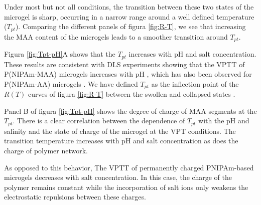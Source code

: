 Under most but not all conditions, the transition between these two states of the microgel is sharp, occurring in a narrow range around a well defined temperature ($T_{pt}$).
Comparing the different panels of figura \ref{fig:R-T}, we see that increasing the MAA content of the microgels leads to a smoother transition around $T_{pt}$.



Figura \ref{fig:Tpt-pH}A shows that the $T_{pt}$ increases with pH and salt concentration.
These results are consistent with DLS experiments showing that the VPTT of P(NIPAm-MAA) microgels increases with pH \addcite[Kleinen2008], which has also been observed for P(NIPAm-AA) microgels \addcite[CaprilesGonzalez2008].
We have defined $T_{pt}$ as the inflection point of the $R(T)$ curves of figura \ref{fig:R-T} between the swollen and collapsed states \addcite[Kratz2001].






Panel B of figura \ref{fig:Tpt-pH} shows the degree of charge of MAA segments at the $T_{pt}$.
There is a clear correlation between the dependence of $T_{pt}$ with the pH and salinity and the state of charge of the microgel at the VPT conditions.
The transition temperature increases with pH and salt concentration as does the charge of polymer network.

As opposed to this behavior, The VPTT of permanently charged PNIPAm-based microgels decreases with salt concentration\addcite[Lopez2020].
In this case, the charge of the polymer remains constant while the incorporation of salt ions only weakens the electrostatic repulsions between these charges.







